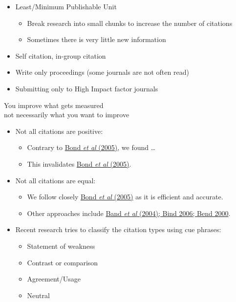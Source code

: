 \documentclass[a4paper,landscape,headrule,footrule,xetex]{foils}
\begin{document}



\begin{itemize}
\item Least/Minimum Publishable Unit
  \begin{itemize}
  \item Break research into small chunks to  increase the number of citations
  \item Sometimes there is very little new information
  \end{itemize}
\item Self citation, in-group citation
\item Write only proceedings (some journals are not often read)
\item Submitting only to High Impact factor journals
\end{itemize}

\begin{center}
  You improve what gets measured 
  \\  not necessarily what you want to improve
\end{center}


\begin{itemize}
\item Not all citations are positive:
  \begin{itemize}
  \item Contrary to \ul{Bond \textit{et al} (2005)}, we found \ldots
  \item This invalidates \ul{Bond \textit{et al} (2005)}.
  \end{itemize}
\item Not all citations are equal:
  \begin{itemize}
  \item We follow closely \ul{Bond \textit{et al} (2005)} as it is efficient and accurate.
  \item Other approaches include \ul{Band \textit{et al} (2004); Bind 2006; Bend 2000}.
  \end{itemize}
\item Recent research tries to classify the citation types using cue phrases:
  \begin{itemize}
  \item Statement of weakness
  \item Contrast or comparison
  \item Agreement/Usage
  \item Neutral 
  \end{itemize}
\end{itemize}
\end{document}
